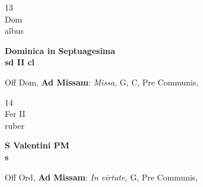 \documentclass[10pt, openany]{book}
\begin{document}
        \begin{center}
            \begin{minipage}{3.5in}
                \vspace{2em}
                \begin{minipage}{0.5in}
                    {\Huge 13} \\
                    {\normalsize Dom} \\
                    {\normalsize albus}
                \end{minipage}
                \begin{minipage}{3.0in}
                    \textbf{ \large Dominica in Septuagesima \\
                    \textnormal{\normalsize sd II cl}} \\ 
                \end{minipage}
                \begin{justify}Off Dom, \textbf{Ad Missam}: \textit{Missa,} G, C, Pre Communis,  
                \end{justify}
            \end{minipage}
        \end{center}
    
        \begin{center}
            \begin{minipage}{3.5in}
                \vspace{2em}
                \begin{minipage}{0.5in}
                    {\Huge 14} \\
                    {\normalsize Fer II} \\
                    {\normalsize ruber}
                \end{minipage}
                \begin{minipage}{3.0in}
                    \textbf{ \large S Valentini PM \\
                    \textnormal{\normalsize s}} \\ 
                \end{minipage}
                \begin{justify}Off Ord, \textbf{Ad Missam}: \textit{In virtute,} G, Pre Communis,  
                \end{justify}
            \end{minipage}
        \end{center}
    
\end{document}
